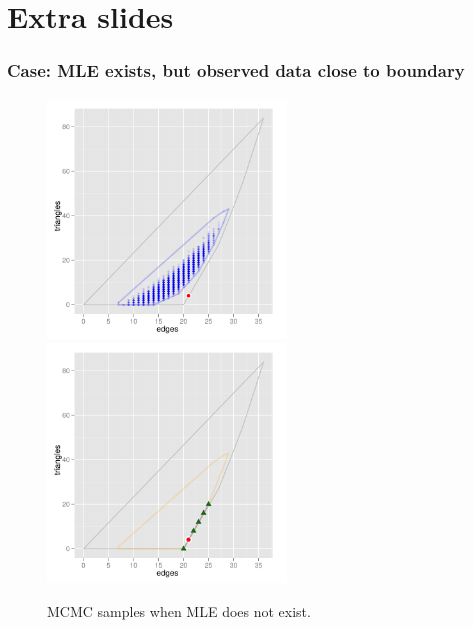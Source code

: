 \documentclass[ 10pt]{beamer}
\begin{document}
\appendix
{}
\setcounter{finalframe}{\value{framenumber}}







\section{Extra slides}
\frame
{
\frametitle{Case: MLE exists, but observed data close to boundary}  
\begin{figure}[h]
\centering
\includegraphics[height=2.5in]{MCsample-problem}
\includegraphics[height=2.5in]{MCsample-fakeface}
\caption{MCMC samples when MLE does not exist.}
\label{F:MCsample-MLE problem}
\end{figure}
}
\end{document}
